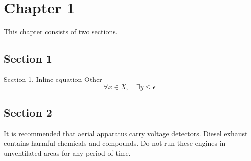 \chapter{Chapter 1}
\label{chapter:1}

This chapter consists of two sections.

\section{Section 1}
\label{section:1}

Section 1. Inline equation 
Other 
\begin{equation}
\label{eq:1}
    \forall x \in X, \quad \exists y \leq \epsilon
\end{equation}


\section{Section 2}
\label{section:2}

It is recommended that aerial apparatus carry voltage detectors. Diesel exhaust contains harmful chemicals and compounds. Do not run these engines in unventilated areas for any period of time.